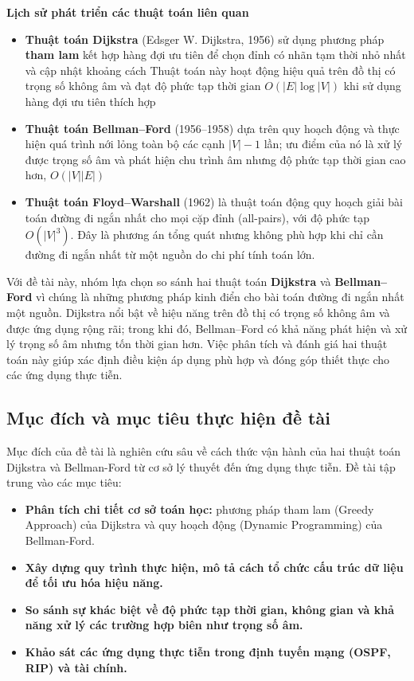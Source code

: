 \documentclass[14pt,a4paper]{report}
\begin{document}
    \textbf{Lịch sử phát triển các thuật toán liên quan}
    \begin{itemize}
      \item \textbf{Thuật toán Dijkstra} (Edsger W. Dijkstra, 1956) sử dụng phương pháp \textbf{tham lam} kết hợp hàng đợi ưu tiên để chọn đỉnh có nhãn tạm thời nhỏ nhất và cập nhật khoảng cách
      Thuật toán này hoạt động hiệu quả trên đồ thị có trọng số không âm và đạt độ phức tạp thời gian $O(|E|\log|V|)$ khi sử dụng hàng đợi ưu tiên thích hợp
      
      \item \textbf{Thuật toán Bellman--Ford} (1956--1958) dựa trên quy hoạch động và thực hiện quá trình nới lỏng toàn bộ các cạnh $|V|-1$ lần; ưu điểm của nó là xử lý được trọng số âm và phát hiện chu trình âm nhưng độ phức tạp thời gian cao hơn, $O(|V||E|)$
      
      \item \textbf{Thuật toán Floyd--Warshall} (1962) là thuật toán động quy hoạch giải bài toán đường đi ngắn nhất cho mọi cặp đỉnh (all-pairs), với độ phức tạp $O(|V|^3)$. Đây là phương án tổng quát nhưng không phù hợp khi chỉ cần đường đi ngắn nhất từ một nguồn do chi phí tính toán lớn.
    \end{itemize}
        \vspace{2.5pt}
    
    Với đề tài này, nhóm lựa chọn so sánh hai thuật toán \textbf{Dijkstra} và \textbf{Bellman--Ford} vì chúng là những phương pháp kinh điển cho bài toán đường đi ngắn nhất một nguồn. Dijkstra nổi bật về hiệu năng trên đồ thị có trọng số không âm và được ứng dụng rộng rãi; trong khi đó, Bellman--Ford có khả năng phát hiện và xử lý trọng số âm nhưng tốn thời gian hơn. Việc phân tích và đánh giá hai thuật toán này giúp xác định điều kiện áp dụng phù hợp và đóng góp thiết thực cho các ứng dụng thực tiễn.


\subsection{Mục đích và mục tiêu thực hiện đề tài}
\justifying\fontsize{11.5pt}{12pt}\selectfont
Mục đích của đề tài là nghiên cứu sâu về cách thức vận hành của hai thuật toán Dijkstra và Bellman-Ford từ cơ sở lý thuyết đến ứng dụng thực tiễn. Đề tài tập trung vào các mục tiêu:
\begin{itemize}
    \item\textbf{Phân tích chi tiết cơ sở toán học:} phương pháp tham lam (Greedy Approach) của Dijkstra và quy hoạch động (Dynamic Programming) của Bellman-Ford.
    \item\textbf{Xây dựng quy trình thực hiện, mô tả cách tổ chức cấu trúc dữ liệu để tối ưu hóa hiệu năng.}
    \item\textbf{So sánh sự khác biệt về độ phức tạp thời gian, không gian và khả năng xử lý các trường hợp biên như trọng số âm.} 
    \item\textbf{Khảo sát các ứng dụng thực tiễn trong định tuyến mạng (OSPF, RIP) và tài chính.}
\end{itemize}
\end{document}
